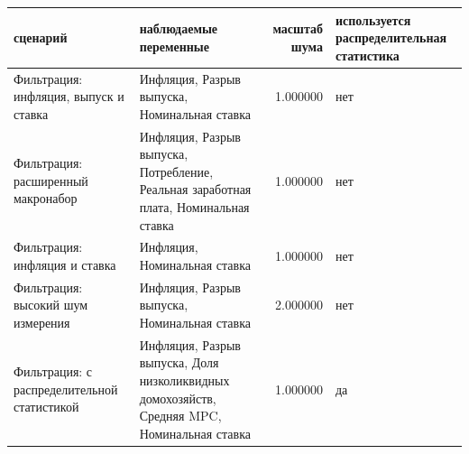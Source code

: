 \begin{tabular}{llrl}
\toprule
сценарий & наблюдаемые переменные & масштаб шума & используется распределительная статистика \\
\midrule
Фильтрация: инфляция, выпуск и ставка & Инфляция, Разрыв выпуска, Номинальная ставка & 1.000000 & нет \\
Фильтрация: расширенный макронабор & Инфляция, Разрыв выпуска, Потребление, Реальная заработная плата, Номинальная ставка & 1.000000 & нет \\
Фильтрация: инфляция и ставка & Инфляция, Номинальная ставка & 1.000000 & нет \\
Фильтрация: высокий шум измерения & Инфляция, Разрыв выпуска, Номинальная ставка & 2.000000 & нет \\
Фильтрация: с распределительной статистикой & Инфляция, Разрыв выпуска, Доля низколиквидных домохозяйств, Средняя MPC, Номинальная ставка & 1.000000 & да \\
\bottomrule
\end{tabular}

